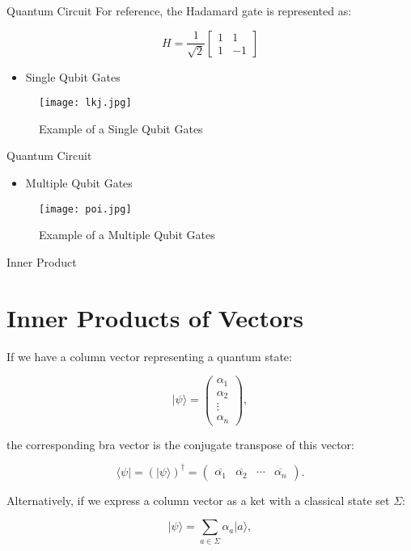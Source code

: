 \documentclass[12pt, aspectratio=169]{beamer}
\begin{document}
\begin{frame}{Quantum Circuit}
For reference, the Hadamard gate is represented as:

\[
H = \frac{1}{\sqrt{2}} \begin{bmatrix}
1 & 1 \\
1 & -1
\end{bmatrix}
\]

\begin{itemize}
\item{Single Qubit Gates}
\end{itemize}
\begin{figure}[h]
    \centering
    \texttt{[image: lkj.jpg]}
    \caption{Example of a Single Qubit Gates}
    \label{fig:Single Qubit Gates}
\end{figure}
\end{frame}
\begin{frame}{Quantum Circuit}
\begin{itemize}
\item{Multiple Qubit Gates}
\end{itemize}
\begin{figure}[h]
    \centering
    \texttt{[image: poi.jpg]}
    \caption{Example of a Multiple Qubit Gates}
    \label{fig:Multiple Qubit Gates}
\end{figure}
\end{frame}
\begin{frame}{Inner Product}


\section*{Inner Products of Vectors}

If we have a column vector representing a quantum state:

\[
\vert \psi \rangle = \begin{pmatrix} \alpha_1 \\ \alpha_2 \\ \vdots \\ \alpha_n \end{pmatrix},
\]

the corresponding bra vector is the conjugate transpose of this vector:

\[
\langle \psi \vert = (\vert \psi \rangle)^\dagger = \begin{pmatrix} \overline{\alpha_1} & \overline{\alpha_2} & \cdots & \overline{\alpha_n} \end{pmatrix}. \tag{1}
\]

Alternatively, if we express a column vector as a ket with a classical state set \(\Sigma\):

\[
\vert \psi \rangle = \sum_{a\in\Sigma} \alpha_a \vert a \rangle,
\]
\end{frame}
\end{document}
